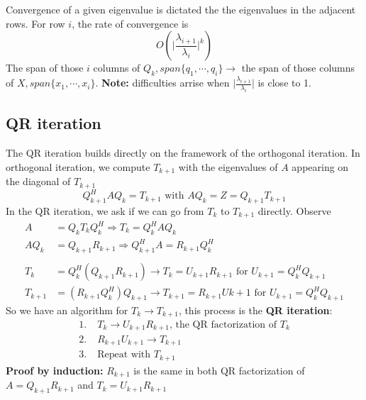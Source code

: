 \documentclass{article}
\newcommand{\abs}[1]{\lvert#1\rvert}
\begin{document}
Convergence of a given eigenvalue is dictated the the eigenvalues in the adjacent rows. For row $i$, the rate of convergence is
\begin{equation*}
    O(\abs{\frac{\lambda_{i+1}}{\lambda_i}}^k)
\end{equation*}
The span of those $i$ columns of $Q_k, span\{q_1, \cdots, q_i\} \longrightarrow$ the span of those columns of $X, span \{x_1, \cdots, x_i\}$. \textbf{Note:} difficulties arrise when $\abs{\frac{\lambda_{i+1}}{\lambda_i}}$ is close to 1.

\subsection{QR iteration}
The QR iteration builds directly on the framework of the orthogonal iteration. In orthogonal iteration, we compute $T_{k+1}$ with the eigenvalues of $A$ appearing on the diagonal of $T_{k+1}$
\begin{equation*}
    Q_{k+1}^HAQ_k = T_{k+1} \textrm{ with }AQ_k = Z = Q_{k+1}T_{k+1}
\end{equation*} 
In the QR iteration, we ask if we can go from $T_k$ to $T_{k+1}$ directly. Observe
\begin{align*}
    A &= Q_k T_k Q_k^H \Longrightarrow T_k = Q_k^HAQ_k\\
    AQ_k &= Q_{k+1}R_{k+1} \Longrightarrow Q_{k+1}^HA = R_{k+1}Q_k^H\\ \\
    T_k &= Q_k^H(Q_{k+1}R_{k+1}) \longrightarrow T_k = U_{k+1} R_{k+1} \textrm{ for } U_{k+1} = Q_k^HQ_{k+1}\\
    T_{k+1} &= (R_{k+1}Q_k^H)Q_{k+1} \longrightarrow T_{k+1} = R_{k+1}U{k+1} \textrm{ for } U_{k+1} = Q_k^HQ_{k+1}
\end{align*} 
So we have an algorithm for $T_k \rightarrow T_{k+1}$, this process is the \textbf{QR iteration}:
\begin{align*}
    1. \;& T_k \longrightarrow U_{k+1}R_{k+1} \textrm{, the QR factorization of } T_k\\
    2. \;&R_{k+1}U_{k+1} \longrightarrow T_{k+1}\\
    3. \;&\textrm{Repeat with } T_{k+1}
\end{align*}
\textbf{Proof by induction:} $R_{k+1}$ is the same in both QR factorization of $A = Q_{k+1}R_{k+1}$ and $T_k = U_{k+1}R_{k+1}$
\end{document}
